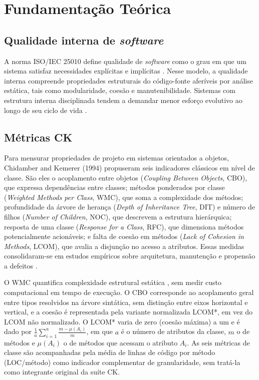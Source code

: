 \section{Fundamentação Teórica}
\label{sec:fund}

\subsection{Qualidade interna de \emph{software}}
\label{subsec:fund-qualidade}

A norma ISO/IEC 25010 define qualidade de \emph{software} como o grau em que um sistema satisfaz necessidades explícitas e implícitas \cite{iso25010}. Nesse modelo, a qualidade interna compreende propriedades estruturais do código-fonte aferíveis por análise estática, tais como modularidade, coesão e manutenibilidade. Sistemas com estrutura interna disciplinada tendem a demandar menor esforço evolutivo ao longo de seu ciclo de vida \cite{pressman:21}.

\subsection{Métricas CK}
\label{subsec:fund-ck}

Para mensurar propriedades de projeto em sistemas orientados a objetos, Chidamber and Kemerer (1994)\nocite{chidamber:94} propuseram seis indicadores clássicos em nível de classe. São eles o acoplamento entre objetos (\emph{Coupling Between Objects}, CBO), que expressa dependências entre classes; métodos ponderados por classe (\emph{Weighted Methods per Class}, WMC), que soma a complexidade dos métodos; profundidade da árvore de herança (\emph{Depth of Inheritance Tree}, DIT) e número de filhos (\emph{Number of Children}, NOC), que descrevem a estrutura hierárquica; resposta de uma classe (\emph{Response for a Class}, RFC), que dimensiona métodos potencialmente acionáveis; e falta de coesão em métodos (\emph{Lack of Cohesion in Methods}, LCOM), que avalia a disjunção no acesso a atributos. Essas medidas consolidaram-se em estudos empíricos sobre arquitetura, manutenção e propensão a defeitos \cite{singh:12,radjenovic:13,aniche:16}.

O WMC quantifica complexidade estrutural estática \cite{aniche:ck}, sem medir custo computacional em tempo de execução. O CBO corresponde ao acoplamento geral entre tipos resolvidos na árvore sintática, sem distinção entre eixos horizontal e vertical, e a coesão é representada pela variante normalizada LCOM*, em vez do LCOM não normalizado. O LCOM* varia de zero (coesão máxima) a um e é dado por $\frac{1}{a}\sum_{i=1}^{a}\frac{m-\mu(A_i)}{m}$, em que $a$ é o número de atributos da classe, $m$ o de métodos e $\mu(A_i)$ o de métodos que acessam o atributo $A_i$. As seis métricas de classe são acompanhadas pela média de linhas de código por método (LOC/método) como indicador complementar de granularidade, sem tratá-la como integrante original da suíte CK.

